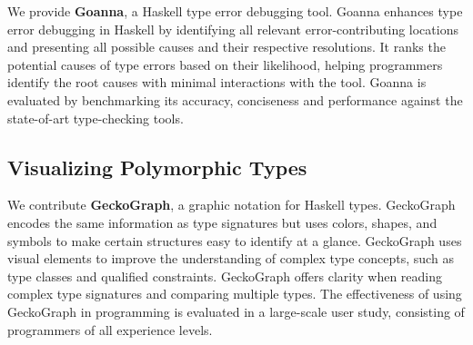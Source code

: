 We provide \textbf{Goanna}, a Haskell type error debugging tool. Goanna enhances type error debugging in Haskell by identifying all relevant error-contributing locations and presenting all possible causes and their respective resolutions. It ranks the potential causes of type errors based on their likelihood, helping programmers identify the root causes with minimal interactions with the tool. Goanna is evaluated by benchmarking its accuracy, conciseness and performance against the state-of-art type-checking tools.



\subsection*{Visualizing Polymorphic Types}

We contribute \textbf{GeckoGraph}, a graphic notation for Haskell types. GeckoGraph encodes the same information as type signatures but uses colors, shapes, and symbols to make certain structures easy to identify at a glance. GeckoGraph uses visual elements to improve the understanding of complex type concepts, such as type classes and qualified constraints. GeckoGraph offers clarity when reading complex type signatures and comparing multiple types. The effectiveness of using GeckoGraph in programming is evaluated in a large-scale user study, consisting of programmers of all experience levels.


